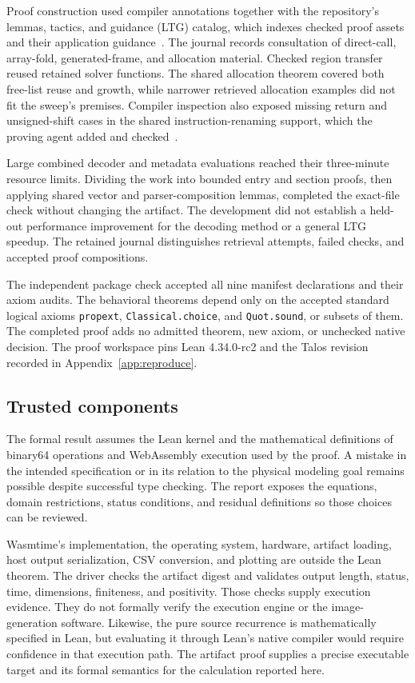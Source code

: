 \documentclass[11pt]{article}
\newcommand{\code}[1]{\texttt{#1}}
\begin{document}
Proof construction used compiler annotations together with the repository's lemmas, tactics, and guidance (LTG) catalog, which indexes checked proof assets and their application guidance~\cite{ltg}.  The journal records consultation of direct-call, array-fold, generated-frame, and allocation material.  Checked region transfer reused retained solver functions.  The shared allocation theorem covered both free-list reuse and growth, while narrower retrieved allocation examples did not fit the sweep's premises.  Compiler inspection also exposed missing return and unsigned-shift cases in the shared instruction-renaming support, which the proving agent added and checked~\cite{journal}.

Large combined decoder and metadata evaluations reached their three-minute resource limits.  Dividing the work into bounded entry and section proofs, then applying shared vector and parser-composition lemmas, completed the exact-file check without changing the artifact.  The development did not establish a held-out performance improvement for the decoding method or a general LTG speedup.  The retained journal distinguishes retrieval attempts, failed checks, and accepted proof compositions.

The independent package check accepted all nine manifest declarations and their axiom audits.  The behavioral theorems depend only on the accepted standard logical axioms \code{propext}, \code{Classical.choice}, and \code{Quot.sound}, or subsets of them.  The completed proof adds no admitted theorem, new axiom, or unchecked native decision.  The proof workspace pins Lean 4.34.0-rc2 and the Talos revision recorded in Appendix~\ref{app:reproduce}.

\subsection{Trusted components}
\label{sec:trusted}

The formal result assumes the Lean kernel and the mathematical definitions of binary64 operations and WebAssembly execution used by the proof.  A mistake in the intended specification or in its relation to the physical modeling goal remains possible despite successful type checking.  The report exposes the equations, domain restrictions, status conditions, and residual definitions so those choices can be reviewed.

Wasmtime's implementation, the operating system, hardware, artifact loading, host output serialization, CSV conversion, and plotting are outside the Lean theorem.  The driver checks the artifact digest and validates output length, status, time, dimensions, finiteness, and positivity.  Those checks supply execution evidence.  They do not formally verify the execution engine or the image-generation software.  Likewise, the pure source recurrence is mathematically specified in Lean, but evaluating it through Lean's native compiler would require confidence in that execution path.  The artifact proof supplies a precise executable target and its formal semantics for the calculation reported here.
\end{document}
